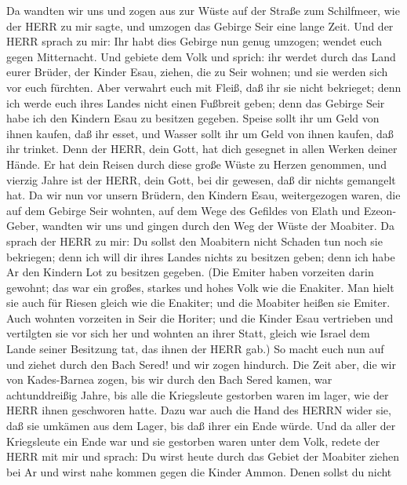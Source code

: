  Da wandten wir uns und zogen aus zur Wüste auf der Straße
zum Schilfmeer, wie der HERR zu mir sagte, und umzogen das Gebirge Seir
eine lange Zeit.  Und der HERR sprach zu mir: 
Ihr habt dies Gebirge nun genug umzogen; wendet euch gegen Mitternacht.
 Und gebiete dem Volk und sprich: ihr werdet durch das Land
eurer Brüder, der Kinder Esau, ziehen, die zu Seir wohnen; und sie
werden sich vor euch fürchten. Aber verwahrt euch mit Fleiß,
 daß ihr sie nicht bekrieget; denn ich werde euch ihres
Landes nicht einen Fußbreit geben; denn das Gebirge Seir habe ich den
Kindern Esau zu besitzen gegeben.  Speise sollt ihr um Geld
von ihnen kaufen, daß ihr esset, und Wasser sollt ihr um Geld von ihnen
kaufen, daß ihr trinket.  Denn der HERR, dein Gott, hat dich
gesegnet in allen Werken deiner Hände. Er hat dein Reisen durch diese
große Wüste zu Herzen genommen, und vierzig Jahre ist der HERR, dein
Gott, bei dir gewesen, daß dir nichts gemangelt hat.  Da wir
nun vor unsern Brüdern, den Kindern Esau, weitergezogen waren, die auf
dem Gebirge Seir wohnten, auf dem Wege des Gefildes von Elath und
Ezeon-Geber, wandten wir uns und gingen durch den Weg der Wüste der
Moabiter.  Da sprach der HERR zu mir: Du sollst den
Moabitern nicht Schaden tun noch sie bekriegen; denn ich will dir ihres
Landes nichts zu besitzen geben; denn ich habe Ar den Kindern Lot zu
besitzen gegeben.  (Die Emiter haben vorzeiten darin
gewohnt; das war ein großes, starkes und hohes Volk wie die Enakiter.
 Man hielt sie auch für Riesen gleich wie die Enakiter; und
die Moabiter heißen sie Emiter.  Auch wohnten vorzeiten in
Seir die Horiter; und die Kinder Esau vertrieben und vertilgten sie vor
sich her und wohnten an ihrer Statt, gleich wie Israel dem Lande seiner
Besitzung tat, das ihnen der HERR gab.)  So macht euch nun
auf und ziehet durch den Bach Sered! und wir zogen hindurch.
 Die Zeit aber, die wir von Kades-Barnea zogen, bis wir
durch den Bach Sered kamen, war achtunddreißig Jahre, bis alle die
Kriegsleute gestorben waren im lager, wie der HERR ihnen geschworen
hatte.  Dazu war auch die Hand des HERRN wider sie, daß sie
umkämen aus dem Lager, bis daß ihrer ein Ende würde.  Und
da aller der Kriegsleute ein Ende war und sie gestorben waren unter dem
Volk,  redete der HERR mit mir und sprach:  Du
wirst heute durch das Gebiet der Moabiter ziehen bei Ar 
und wirst nahe kommen gegen die Kinder Ammon. Denen sollst du nicht
